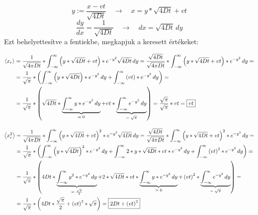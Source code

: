 \begin{equation*}
    y := \frac{x - vt}{\sqrt{4Dt}} \quad \to \quad x = y * \sqrt{4Dt} + vt
\end{equation*}
\begin{equation*}
    \frac{dy}{dx} = \frac{1}{\sqrt{4Dt}} \quad \to \quad dx = \sqrt{4Dt}\, dy
\end{equation*}
Ezt behelyettesítve a fentiekbe, megkapjuk a keresett értékeket:

\begin{align} \label{eq:37}
    \left< x_{r} \right>
    &=
    \frac{1}{\sqrt{4 \pi D t}} * \int_{- \infty}^{\infty} \left( y * \sqrt{4Dt} + vt \right) * e^{-y^{2}} \sqrt{4Dt}\, dy
    =
    \frac{\sqrt{4Dt}}{\sqrt{4 \pi D t}} * \int_{- \infty}^{\infty} \left( y * \sqrt{4Dt} + vt \right) * e^{-y^{2}}\, dy = \nonumber \\
    &=
    \frac{1}{\sqrt{\pi}} * \left( \int_{- \infty}^{\infty} \left( y * \sqrt{4Dt} \right) * e^{-y^{2}}\, dy + \int_{- \infty}^{\infty} \left( vt \right) * e^{-y^{2}}\, dy \right) = \nonumber \\
    &=
    \frac{1}{\sqrt{\pi}} * \left( \sqrt{4Dt} * \underbrace{\int_{- \infty}^{\infty} y * e^{-y^{2}}\, dy}_{\text{\normalfont $= 0$}} + vt * \underbrace{\int_{- \infty}^{\infty} e^{-y^{2}}\, dy}_{\text{\normalfont $= \sqrt{\pi}$}} \right)
    =
    \frac{\sqrt{\pi}}{\sqrt{\pi}} * vt = \boxed{vt}
\end{align}

\begin{align} \label{eq:38}
    \left< x_{r}^{2} \right>
    &=
    \frac{1}{\sqrt{4 \pi D t}} * \int_{- \infty}^{\infty} \left( y * \sqrt{4Dt} + vt \right)^{2} * e^{-y^{2}} \sqrt{4Dt}\, dy
    =
    \frac{\sqrt{4Dt}}{\sqrt{4 \pi D t}} * \int_{- \infty}^{\infty} \left( y * \sqrt{4Dt} + vt \right)^{2} * e^{-y^{2}}\, dy = \nonumber \\
    &=
    \frac{1}{\sqrt{\pi}} * \left( \int_{- \infty}^{\infty} \left( y * \sqrt{4Dt} \right)^{2} * e^{-y^{2}}\, dy
    +
    \int_{- \infty}^{\infty} 2 * y * \sqrt{4Dt} * vt * e^{-y^{2}}\, dy
    +
    \int_{- \infty}^{\infty} \left( vt \right)^{2} * e^{-y^{2}}\, dy \right) = \nonumber \\
    &=
    \frac{1}{\sqrt{\pi}} * \left( 4Dt * \underbrace{\int_{- \infty}^{\infty} y^{2} * e^{-y^{2}}\, dy}_{\text{\normalfont $= \frac{\sqrt{\pi}}{2}$}}
    +
    2 * \sqrt{4Dt} * vt * \underbrace{\int_{- \infty}^{\infty} y * e^{-y^{2}}\, dy}_{\text{\normalfont $= 0$}}
    +
    \left( vt \right)^{2} * \underbrace{\int_{- \infty}^{\infty} e^{-y^{2}}\, dy}_{\text{\normalfont $= \sqrt{\pi}$}} \right) = \nonumber \\
    &=
    \frac{1}{\sqrt{\pi}} * \left( 4Dt * \frac{\sqrt{\pi}}{2}
    +
    \left( vt \right)^{2} * \sqrt{\pi} \right)
    =
    \boxed{2Dt + \left( vt \right)^{2}}
\end{align}

